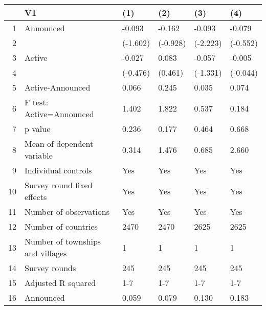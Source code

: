 \begin{table}[ht]
\centering
\begin{tabular}{rlllll}
  \hline
 & V1 & (1) & (2) & (3) & (4) \\ 
  \hline
1 & Announced & -0.093 & -0.162 & -0.093 & -0.079 \\ 
  2 &  & (-1.602) & (-0.928) & (-2.223) & (-0.552) \\ 
  3 & Active & -0.027 & 0.083 & -0.057 & -0.005 \\ 
  4 &  & (-0.476) & (0.461) & (-1.331) & (-0.044) \\ 
  5 & Active-Announced & 0.066 & 0.245 & 0.035 & 0.074 \\ 
  6 & F test: Active=Announced & 1.402 & 1.822 & 0.537 & 0.184 \\ 
  7 & p value & 0.236 & 0.177 & 0.464 & 0.668 \\ 
  8 & Mean of dependent variable & 0.314 & 1.476 & 0.685 & 2.660 \\ 
  9 & Individual controls & Yes & Yes & Yes & Yes \\ 
  10 & Survey round fixed effects & Yes & Yes & Yes & Yes \\ 
  11 & Number of observations & Yes & Yes & Yes & Yes \\ 
  12 & Number of countries & 2470 & 2470 & 2625 & 2625 \\ 
  13 & Number of townships and villages & 1 & 1 & 1 & 1 \\ 
  14 & Survey rounds & 245 & 245 & 245 & 245 \\ 
  15 & Adjusted R squared & 1-7 & 1-7 & 1-7 & 1-7 \\ 
  16 & Announced & 0.059 & 0.079 & 0.130 & 0.183 \\ 
   \hline
\end{tabular}
\end{table}
